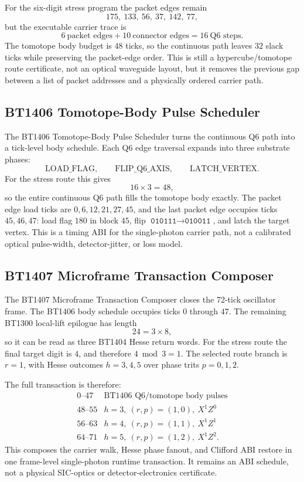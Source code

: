 ﻿\documentclass[12pt]{article}
\begin{document}
For the six-digit stress program the packet edges remain
\[
175,\ 133,\ 56,\ 37,\ 142,\ 77,
\]
but the executable carrier trace is
\[
6\ \text{packet edges} + 10\ \text{connector edges} = 16\ \text{Q6 steps}.
\]
The tomotope body budget is \(48\) ticks, so the continuous path leaves
\(32\) slack ticks while preserving the packet-edge order.  This is still a
hypercube/tomotope route certificate, not an optical waveguide layout, but it
removes the previous gap between a list of packet addresses and a physically
ordered carrier path.

\subsection{BT1406 Tomotope-Body Pulse Scheduler}

The BT1406 Tomotope-Body Pulse Scheduler turns the continuous Q6 path into a
tick-level body schedule.  Each Q6 edge traversal expands into three substrate
phases:
\[
\text{LOAD\_FLAG},\qquad \text{FLIP\_Q6\_AXIS},\qquad \text{LATCH\_VERTEX}.
\]
For the stress route this gives
\[
16\times 3=48,
\]
so the entire continuous Q6 path fills the tomotope body exactly.  The packet
edge load ticks are \(0,6,12,21,27,45\), and the last packet edge occupies
ticks \(45,46,47\): load flag \(180\) in block \(45\), flip
\(\texttt{010111}\to\texttt{010011}\), and latch the target vertex.  This is a
timing ABI for the single-photon carrier path, not a calibrated optical
pulse-width, detector-jitter, or loss model.

\subsection{BT1407 Microframe Transaction Composer}

The BT1407 Microframe Transaction Composer closes the 72-tick oscillator frame.
The BT1406 body schedule occupies ticks \(0\) through \(47\).  The remaining
BT1300 local-lift epilogue has length
\[
24=3\times 8,
\]
so it can be read as three BT1404 Hesse return words.  For the stress route the
final target digit is \(4\), and therefore \(4\bmod 3=1\).  The selected route
branch is \(r=1\), with Hesse outcomes \(h=3,4,5\) over phase trits
\(p=0,1,2\).

The full transaction is therefore:
\[
\begin{array}{c|l}
0\text{--}47 & \text{BT1406 Q6/tomotope body pulses}\\
48\text{--}55 & h=3,\ (r,p)=(1,0),\ X^1Z^0\\
56\text{--}63 & h=4,\ (r,p)=(1,1),\ X^1Z^1\\
64\text{--}71 & h=5,\ (r,p)=(1,2),\ X^1Z^2.
\end{array}
\]
This composes the carrier walk, Hesse phase fanout, and Clifford ABI restore in
one frame-level single-photon runtime transaction.  It remains an ABI schedule,
not a physical SIC-optics or detector-electronics certificate.
\end{document}
